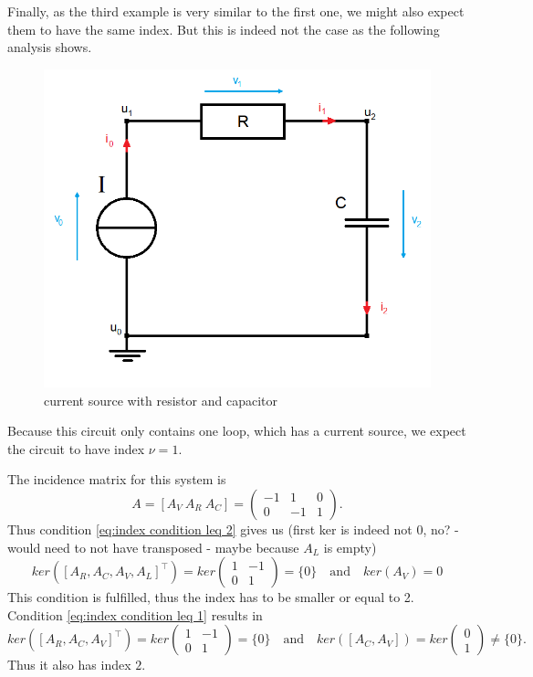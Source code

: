 	Finally, as the third example is very similar to the first one, we might also expect them to have the same index. But this is indeed not the case as the following analysis shows. 
	\begin{figure}[H]
		\centering
		\includegraphics[scale = 0.4]{pictures/Example3.png}
		\caption{current source with resistor and capacitor} 
	\end{figure}
	Because this circuit only contains one loop, which has a current source, we expect the circuit to have index $\nu = 1$.
	
	The incidence matrix for this system is
	\begin{displaymath}
		A = [A_V~A_R~A_C] = 
		\left(
		\begin{matrix}
			-1 & 1 & 0 \\
			0 & -1 & 1 
		\end{matrix}
		\right).
	\end{displaymath} 
	Thus condition \eqref{eq:index condition leq 2} gives us (first ker is indeed not 0, no? - would need to not have transposed - maybe because $A_L$ is empty)
	\begin{displaymath}
		ker([A_R, A_C, A_V, A_L]^\top) = ker
		\left(
		\begin{matrix}
			1 & -1 \\
			0 & 1
		\end{matrix}
		\right) = \{0\}
		\quad \text{and} \quad 
		ker(A_V) = {0}
	\end{displaymath}
	This condition is fulfilled, thus the index has to be smaller or equal to 2.
	Condition \eqref{eq:index condition leq 1} results in
	\begin{displaymath}
		ker([A_R, A_C, A_V]^\top) = ker\left(
		\begin{matrix}
			1 & -1 \\
			0 & 1 
		\end{matrix}
		\right) = \{0\}
		\quad \text{and} \quad
		ker([A_C, A_V]) = ker
		\left(
		\begin{matrix}
			0 \\
			1
		\end{matrix}
		\right) \neq \{0\}.
	\end{displaymath}
	Thus it also has index $2$.

